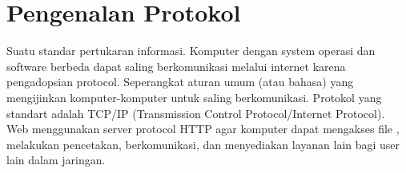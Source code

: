 

\section{Pengenalan Protokol} 
 Suatu standar pertukaran informasi. Komputer dengan system operasi dan software berbeda dapat saling berkomunikasi melalui internet karena pengadopsian protocol. Seperangkat aturan umum (atau bahasa) yang mengijinkan komputer-komputer untuk saling berkomunikasi. Protokol yang standart adalah TCP/IP (Transmission Control Protocol/Internet Protocol). Web menggunakan server protocol HTTP agar komputer dapat mengakses file , melakukan pencetakan, berkomunikasi, dan menyediakan layanan lain bagi user lain dalam jaringan. 

  \subsection{} 
   
    
  \subsection{} 
    
